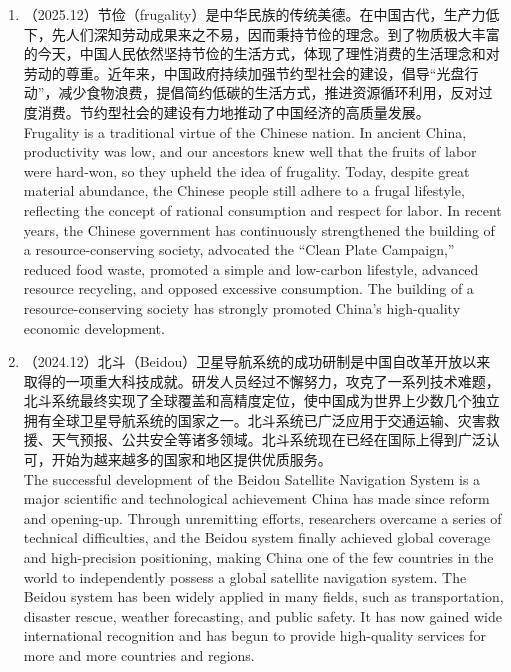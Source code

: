 ﻿\documentclass[lang=cn,11pt]{elegantbook}
\begin{document}
\begin{enumerate}
    \item （2025.12）节俭（frugality）是中华民族的传统美德。在中国古代，生产力低下，先人们深知劳动成果来之不易，因而秉持节俭的理念。到了物质极大丰富的今天，中国人民依然坚持节俭的生活方式，体现了理性消费的生活理念和对劳动的尊重。近年来，中国政府持续加强节约型社会的建设，倡导“光盘行动”，减少食物浪费，提倡简约低碳的生活方式，推进资源循环利用，反对过度消费。节约型社会的建设有力地推动了中国经济的高质量发展。\\Frugality is a traditional virtue of the Chinese nation. In ancient China, productivity was low, and our ancestors knew well that the fruits of labor were hard-won, so they upheld the idea of frugality. Today, despite great material abundance, the Chinese people still adhere to a frugal lifestyle, reflecting the concept of rational consumption and respect for labor. In recent years, the Chinese government has continuously strengthened the building of a resource-conserving society, advocated the “Clean Plate Campaign,” reduced food waste, promoted a simple and low-carbon lifestyle, advanced resource recycling, and opposed excessive consumption. The building of a resource-conserving society has strongly promoted China’s high-quality economic development.
    \item （2024.12）北斗（Beidou）卫星导航系统的成功研制是中国自改革开放以来取得的一项重大科技成就。研发人员经过不懈努力，攻克了一系列技术难题，北斗系统最终实现了全球覆盖和高精度定位，使中国成为世界上少数几个独立拥有全球卫星导航系统的国家之一。北斗系统已广泛应用于交通运输、灾害救援、天气预报、公共安全等诸多领域。北斗系统现在已经在国际上得到广泛认可，开始为越来越多的国家和地区提供优质服务。\\The successful development of the Beidou Satellite Navigation System is a major scientific and technological achievement China has made since reform and opening-up. Through unremitting efforts, researchers overcame a series of technical difficulties, and the Beidou system finally achieved global coverage and high-precision positioning, making China one of the few countries in the world to independently possess a global satellite navigation system. The Beidou system has been widely applied in many fields, such as transportation, disaster rescue, weather forecasting, and public safety. It has now gained wide international recognition and has begun to provide high-quality services for more and more countries and regions.

\end{enumerate}
\end{document}
